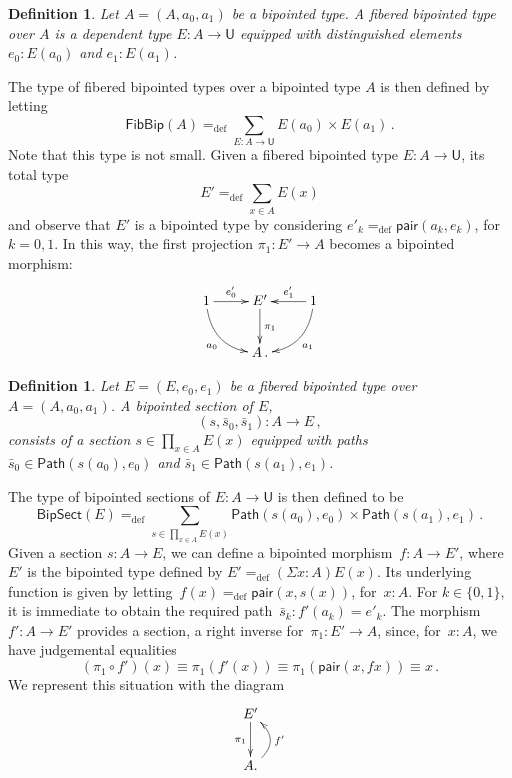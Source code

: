 \documentclass[10pt,a4paper,oneside,reqno]{amsart}
\numberwithin{equation}{section}
\theoremstyle{mythm}
\theoremstyle{mydef}
\newtheorem{definition}[theorem]{Definition}
\theoremstyle{myrmk}
\newcommand{\ie}{\text{i.e.\ }}
\newcommand{\deq}{\equiv}
\newcommand{\defeq}{=_{\mathrm{def}}}
\newcommand{\co}{\colon}
\newcommand{\pair}{\mathsf{pair}}
\newcommand{\Id}{\mathsf{Path}}
\newcommand{\UU}{\mathsf{U}}
\newcommand{\FibBip}{\mathsf{FibBip}}
\newcommand{\BipSect}{\mathsf{BipSect}}
\begin{document}
\begin{definition} \label{def:fibbipointed}
Let $A = (A, a_0, a_1)$ be a bipointed type. A \emph{fibered bipointed type} over $A$ is a dependent type
$E \co A \to \UU$ equipped with distinguished elements $e_0 \co E(a_0)$ and $e_1 \co E(a_1)$.
\end{definition}

The type of  fibered bipointed types over a bipointed type $A$ is then defined by letting
\[
\FibBip(A) \defeq \sum_{E \co A \to \UU} E(a_0) \times E(a_1)  \, .
 \]
 Note that this type is not small. 
Given a fibered bipointed type $E \co A \to \UU$, its total type
\[
E'  \defeq \sum_{x \in A} E(x)
\] 
and observe that $E'$ is a bipointed type by considering $e'_k \defeq \pair(a_k, e_k)$, 
for $k =  0, 1$. In this way, the first projection $\pi_1 \co E' \to A$ becomes a bipointed morphism:
\[
\xymatrix{
1 \ar@/_1pc/[dr]_{a_0} \ar[r]^-{e'_0} & E' \ar[d]^{\pi_1} & 1 \ar[l]_-{e'_1} \ar@/^1pc/[dl]^{a_1} \\ 
 & A \, .& }
 \]



\begin{definition} \label{def:fibsection} Let $E = (E, e_0, e_1)$ be a fibered bipointed type over
$A = (A, a_0, a_1)$.  A \emph{bipointed section} of $E$, 
\[
(s, \bar{s}_0, \bar{s}_1) \co A \to E \, ,
\]
consists of a section $s \in \prod_{x \in A} E(x)$ equipped with paths~$\bar{s}_0 \in \Id( s(a_0),  e_0)$ 
and $\bar{s}_1 \in \Id( s(a_1), e_1)$. \end{definition} 


The type of bipointed sections of $E \co A \to \UU$ is then defined to be
\[
\BipSect(E) \defeq \sum_{\textstyle s \in \prod_{x \in A} E(x)} \Id(s(a_0),  e_0)  \times \Id( s(a_1), e_1)  \, .
\]
Given a section $s \co A \to E$, we can define a bipointed morphism~$f  \co A \to E'$, where $E'$ is the
bipointed type defined by $E' \defeq (\Sigma x :A) E(x)$. Its underlying function is given by 
letting~$f(x) \defeq \pair(x, s(x))$, for~$x : A$. For $k \in \{ 0, 1 \}$, it is 
immediate to obtain the required path~$\bar{s}_k \co f'(a_k) = e'_k$.
The morphism $f' \co A \to E'$ provides a section, \ie a right inverse for~$\pi_1 \co E' \to A$,
 since, for~$x \co A$, we have judgemental equalities
\[
 (\pi_1 \circ f')(x) \deq \pi_1 (f'(x)) \deq \pi_1 (\pair(x, f x)) \deq x \, .
\]
 We represent this situation with the diagram
\[
\xymatrix{
E' \ar[d]_{\pi_1} \\
A . \ar@/_1.2pc/[u]_{f'} }
\]
\end{document}
